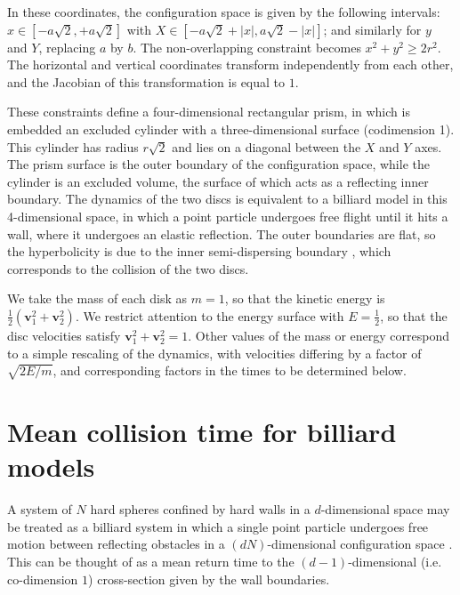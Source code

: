 \documentclass[superscriptaddress,pre,reprint,showpacs,twocolumn]{revtex4-1}
\begin{document}
In these coordinates, the configuration space is given by the following
intervals:
$x \in [-a \sqrt{2}, +a \sqrt{2}]$ with 
$X \in [-a \sqrt{2} + |x|, a \sqrt{2} - |x|]$; and similarly for $y$ and $Y$, replacing $a$ by $b$.
The non-overlapping constraint becomes $x^2 + y^2 \ge 2 r^2$.
The horizontal and vertical coordinates transform independently
from each other, and the Jacobian of this transformation is  equal to $1$.

These constraints define a four-dimensional
rectangular prism, in which is embedded an excluded cylinder with a three-dimensional surface
(codimension 1).
This cylinder has radius $r\sqrt{2}$ and lies
on a diagonal between the $X$ and $Y$ axes.
The prism surface is the outer boundary of the configuration space,
while the cylinder is an excluded volume, the surface of which
acts as a reflecting inner boundary.
The dynamics of the two discs is equivalent to a billiard model in this 4-dimensional space, in which 
a point particle undergoes free flight until
it hits a wall, where it undergoes an elastic reflection.
The outer boundaries are flat, so the
hyperbolicity is due to the inner semi-dispersing
boundary \cite{Sim99}, which corresponds to the collision of
the two discs.


We take the mass of each disk as $m=1$, so that the kinetic energy
is $\frac{1}{2}(\mathbf{v}_1^2 + \mathbf{v}_2^2)$. We restrict attention to the energy surface with
$E = \frac{1}{2}$, so that the disc velocities satisfy $\mathbf{v}_1^2 + \mathbf{v}_2^2 = 1$.
Other values of the mass or energy correspond to a simple rescaling of the dynamics, with velocities differing
by a factor of
$\sqrt{2E/m}$, and corresponding factors in the times to be determined below.


\section{Mean collision time for billiard models}

\label{knownfacts}

A system of $N$ hard spheres confined by hard walls in a $d$-dimensional
space may be treated as a billiard system 
in which a single point particle undergoes free motion between reflecting obstacles 
in a $ (d N) $-dimensional configuration space \cite{Sinai70, Sim99, MarkChern}. 
This can be thought of as a mean return time to the $(d-1)$-dimensional 
(i.e. co-dimension $1$) cross-section given by the wall boundaries.
\end{document}
